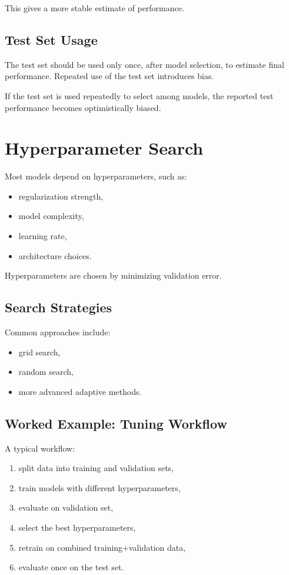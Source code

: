 This gives a more stable estimate of performance.

\subsection{Test Set Usage}

The test set should be used only once, after model selection, to estimate final performance. Repeated use of the test set introduces bias.

\begin{proposition}
If the test set is used repeatedly to select among models, the reported test performance becomes optimistically biased.
\end{proposition}

\section{Hyperparameter Search}

Most models depend on hyperparameters, such as:
\begin{itemize}
    \item regularization strength,
    \item model complexity,
    \item learning rate,
    \item architecture choices.
\end{itemize}

Hyperparameters are chosen by minimizing validation error.

\subsection{Search Strategies}

Common approaches include:
\begin{itemize}
    \item grid search,
    \item random search,
    \item more advanced adaptive methods.
\end{itemize}

\subsection{Worked Example: Tuning Workflow}

A typical workflow:
\begin{enumerate}
    \item split data into training and validation sets,
    \item train models with different hyperparameters,
    \item evaluate on validation set,
    \item select the best hyperparameters,
    \item retrain on combined training+validation data,
    \item evaluate once on the test set.
\end{enumerate}

